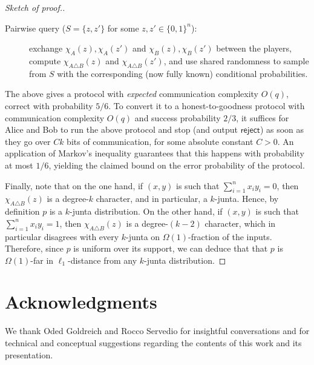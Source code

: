 \documentclass[11pt]{article}
\theoremstyle{remark}   	\newtheorem{remark}[theorem]{Remark}
\theoremstyle{definition}   	\newaliascnt{defn}{theorem}
\newcommand{\reject}{\textsf{reject}\xspace}
\newcommand{\lp}[1][1]{\ell_{#1}}
\newcommand{\bitset}{\ensuremath{\{0,1\}}}
\begin{document}
\begin{proof}[Sketch of proof.]
\begin{description}
\item[Pairwise query ($S=\{z,z'\}$ for some $z,z'\in\bitset^n$):] exchange $\chi_A(z),\chi_A(z')$ and $\chi_B(z),\chi_B(z')$ between the players, compute $\chi_{A \triangle B}(z)$ and $\chi_{A \triangle B}(z')$, and use shared randomness to sample from $S$ with the corresponding (now fully known) conditional probabilities. 
\end{description}
The above gives a protocol with \emph{expected} communication complexity $O(q)$, correct with probability $5/6$. To convert it to a honest-to-goodness protocol with communication complexity $O(q)$ and success probability $2/3$, it suffices for Alice and Bob to run the above protocol and stop (and output $\reject$) as soon as they go over $Ck$ bits of communication, for some absolute constant $C>0$. An application of Markov's inequality guarantees that this happens with probability at most $1/6$, yielding the claimed bound on the error probability of the protocol.

Finally, note that on the one hand, if $(x,y)$ is such that $\sum_{i =1}^n x_i y_i = 0$, then $\chi_{A \triangle B}(z)$ is a degree-$k$ character, and in particular, a $k$-junta. Hence, by definition $p$ is a $k$-junta distribution. On the other hand, if $(x,y)$ is such that $\sum_{i =1}^n x_i y_i = 1$, then $\chi_{A \triangle B}(z)$ is a degree-$(k-2)$ character, which in particular disagrees with every $k$-junta on $\Omega(1)$-fraction of the inputs. Therefore, since $p$ is uniform over its support, we can deduce that that $p$ is $\Omega(1)$-far in $\lp[1]$-distance from any $k$-junta distribution.
\end{proof}

\section*{Acknowledgments}
We thank Oded Goldreich and Rocco Servedio for insightful conversations and for technical and conceptual suggestions regarding the contents of this work and its presentation.
 

 

\clearpage
\appendix
\end{document}
